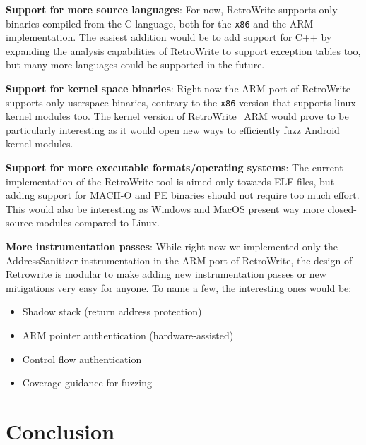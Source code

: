 \documentclass[a4paper,11pt,oneside]{report}
\newcommand{\sysname}{RetroWrite\xspace}
\begin{document}
{

\setlength{\parindent}{0cm}
\hangindent=0.7cm \textbf{Support for more source languages}: For now, 
\sysname supports only binaries compiled from the C language, both for the 
\texttt{x86} and the ARM implementation. The easiest addition would be to add 
support for C++ by expanding the analysis capabilities of \sysname to support 
exception tables too, but many more languages could be supported in the future. 

\hangindent=0.7cm \textbf{Support for kernel space binaries}: Right now the ARM 
port of \sysname supports only userspace binaries, contrary to the 
\texttt{x86} version that supports linux kernel modules too. The kernel version 
of \sysname\_ARM would prove to be particularly interesting as it would open 
new ways to efficiently fuzz Android kernel modules.

\hangindent=0.7cm \textbf{Support for more executable formats/operating 
systems}: The current implementation of the \sysname tool is aimed only 
towards ELF files, but adding support for MACH-O and PE binaries should not 
require too much effort. This would also be interesting as Windows and MacOS 
present way more closed-source modules compared to Linux.

\hangindent=0.7cm \textbf{More instrumentation passes}: While right now we 
implemented only the AddressSanitizer instrumentation in the ARM port of
\sysname, the design of Retrowrite is modular to make
adding new instrumentation passes or new mitigations very easy for anyone. To
name a few, the interesting ones would be:
\begin{itemize}
	\item Shadow stack (return address protection)
	\item ARM pointer authentication (hardware-assisted)
	\item Control flow authentication
	\item Coverage-guidance for fuzzing
\end{itemize}

}

\chapter{Conclusion}

\end{document}

